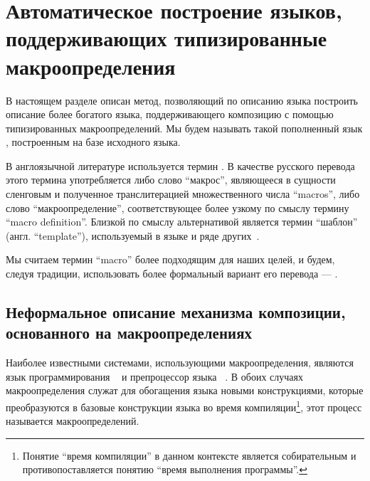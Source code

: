 \chapter{Автоматическое построение языков, поддерживающих типизированные макроопределения}

В настоящем разделе описан метод, позволяющий по описанию языка построить описание более богатого языка, поддерживающего композицию с помощью типизированных макроопределений. Мы будем называть такой пополненный язык , построенным на базе исходного языка.

\begin{Note}[О терминологии]
В англоязычной литературе используется термин  \cite{MacroML,Cpp,Nemerle}. 
В качестве русского перевода этого термина употребляется либо слово ``макрос'', являющееся в сущности сленговым и полученное транслитерацией множественного числа ``macros'', либо слово ``макроопределение'', соответствующее более узкому по смыслу термину ``macro definition''. 
Близкой по смыслу альтернативой является термин ``шаблон'' (англ. ``template''), используемый в языке 
\cite{C++} 
и ряде других~\cite{HTMP,Velocity,UML}. 

Мы считаем термин ``macro'' более подходящим для наших целей, и будем, следуя традиции, использовать более формальный вариант его перевода --- .
\end{Note}

\section{Неформальное описание механизма композиции, основанного на макроопределениях}

Наиболее известными системами, использующими макроопределения, являются язык программирования ~\cite{Lisp} и препроцессор языка ~\cite{C, Cpp}. В обоих случаях макроопределения служат для обогащения языка новыми конструкциями, которые преобразуются в базовые конструкции языка во время компиляции\footnote{Понятие ``время компиляции'' в данном контексте является собирательным и противопоставляется понятию ``время выполнения программы''.}, этот процесс называется  макроопределений.

